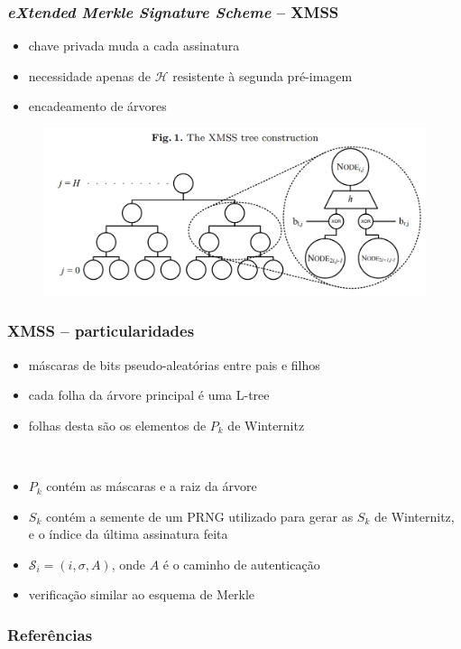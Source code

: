 \documentclass{beamer}
\begin{document}
\begin{frame}
  \frametitle{\emph{eXtended Merkle Signature Scheme} -- XMSS
    \cite{Buchmann:2011:XPF:2184003.2184011}}
  \begin{itemize}
    \item chave privada muda a cada assinatura
    \item necessidade apenas de $\mathcal{H}$ resistente à segunda pré-imagem
    \item encadeamento de árvores
  \end{itemize}

  \begin{figure}
    \centering
    \includegraphics[scale=0.2]{xmss-example.png}
  \end{figure}
\end{frame}

\begin{frame}
  \frametitle{XMSS -- particularidades}
  \begin{itemize}
    \item máscaras de bits pseudo-aleatórias entre pais e filhos
    \item cada folha da árvore principal é uma L-tree
    \item folhas desta são os elementos de $P_k$ de Winternitz
  \end{itemize} \\

  \begin{itemize}
    \item $P_k$ contém as máscaras e a raiz da árvore
    \item $S_k$ contém a semente de um PRNG utilizado para gerar as $S_k$
      de Winternitz, e o índice da última assinatura feita
    \item $\mathcal{S}_i = (i, \sigma, A)$,
      onde $A$ é o caminho de autenticação
    \item verificação similar ao esquema de Merkle
  \end{itemize}
\end{frame}

\begin{frame}[allowframebreaks]
  \frametitle{Referências}
  
  
\end{frame}
\end{document}
